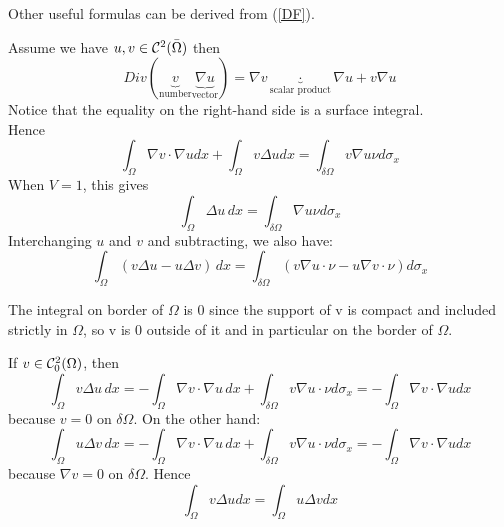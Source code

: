 Other useful formulas can be derived from (\ref{DF}).

Assume we have \( u,v \in \mathcal{C}^2(\Bar{\Omega})\) then 
\begin{equation*}
    Div(\underbrace{v}_{\text{number}} \underbrace{ \nabla u}_{\text{vector}}) = \nabla v \underbrace{\cdot}_{\text{scalar product}} \nabla u + v \nabla u 
\end{equation*}
Notice that the equality on the right-hand side is a surface integral. \\
Hence
\begin{equation*}
    \int_\Omega \nabla v \cdot \nabla u dx+ \int_\Omega v \Delta u dx = \int_{\delta \Omega }v \nabla u \nu d \sigma_x
\end{equation*}
When \( V = 1 \), this gives
\[
\int_{\Omega} \Delta u \, dx = \int_{\delta \Omega } \nabla u \nu d \sigma_x
\]
Interchanging \( u \) and \( v \) and subtracting, we also have:
\begin{equation*}
    \int_{\Omega} (v\Delta u-u \Delta v) \, dx = \int_{\delta \Omega } (v \nabla u \cdot \nu -u \nabla v \cdot \nu ) d \sigma_x
\end{equation*}

\begin{remark}
    The integral on border of $\Omega$ is 0 since the support of v is compact and included strictly in $\Omega$, so v is $0$ outside of it and in particular on the border of $\Omega$.
\end{remark}

If \( v \in \mathcal{C}_0^2(\Omega) \), then
\begin{equation*}
    \int_{\Omega} v\Delta u \, dx = - \int_{\Omega} \nabla v \cdot \nabla u \, dx + \int_{\delta \Omega } v \nabla u \cdot \nu d \sigma_x =-  \int_{\Omega }   \nabla v \cdot \nabla u  dx
\end{equation*}
because \( v = 0 \) on $\delta \Omega  $. On the other hand:
\begin{equation*}
    \int_{\Omega} u\Delta v \, dx = - \int_{\Omega} \nabla v \cdot \nabla u \, dx + \int_{\delta \Omega } v \nabla u \cdot \nu d \sigma_x = - \int_{\Omega }   \nabla v \cdot \nabla u  dx
\end{equation*}
because \( \nabla v =0  \) on \( \delta \Omega \). Hence
\begin{equation*}
    \int_\Omega  v \Delta u dx = \int_\Omega u \Delta v dx 
\end{equation*}
